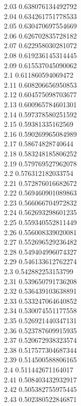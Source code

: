 {2.03	0.638076134492792\\
2.04	0.634261751778533\\
2.05	0.630470697554669\\
2.06	0.626702835728182\\
2.07	0.622958030281072\\
2.08	0.619236145314445\\
2.09	0.615537045090062\\
2.1	0.611860594069472\\
2.11	0.608206656950853\\
2.12	0.604575098703677\\
2.13	0.600965784601301\\
2.14	0.597378580251592\\
2.15	0.59381335162569\\
2.16	0.590269965084989\\
2.17	0.58674828740644\\
2.18	0.583248185806252\\
2.19	0.579769527962078\\
2.2	0.576312182033754\\
2.21	0.572876016682672\\
2.22	0.569460901089863\\
2.23	0.566066704972832\\
2.24	0.562693298601235\\
2.25	0.559340552811449\\
2.26	0.556008339020081\\
2.27	0.552696529236482\\
2.28	0.549404996074327\\
2.29	0.546133612762274\\
2.3	0.542882253153799\\
2.31	0.539650791736208\\
2.32	0.536439103638891\\
2.33	0.533247064640852\\
2.34	0.530074551177558\\
2.35	0.526921440347131\\
2.36	0.523787609915935\\
2.37	0.520672938323574\\
2.38	0.517577304687344\\
2.39	0.514500588806165\\
2.4	0.511442671164017\\
2.41	0.508403432932917\\
2.42	0.505382755975445\\
2.43	0.502380522846871\\
}
